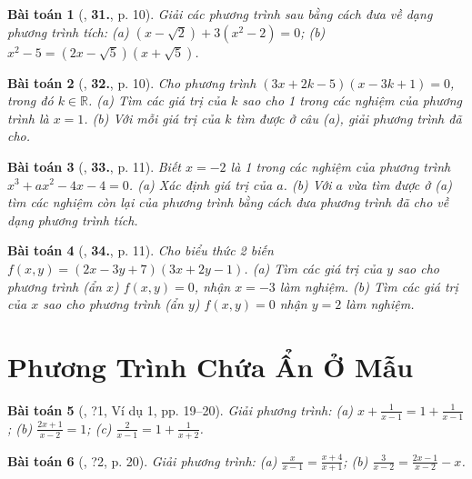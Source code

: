 \documentclass{article}
\numberwithin{equation}{section}
\newtheorem{baitoan}{Bài toán}
\begin{document}
\begin{baitoan}[\cite{SBT_Toan_8_tap_2}, \textbf{31.}, p. 10]
	Giải các phương trình sau bằng cách đưa về dạng phương trình tích: (a) $(x - \sqrt{2}) + 3(x^2 - 2) = 0$; (b) $x^2 - 5 = (2x - \sqrt{5})(x + \sqrt{5})$.
\end{baitoan}

\begin{baitoan}[\cite{SBT_Toan_8_tap_2}, \textbf{32.}, p. 10]
	Cho phương trình $(3x + 2k - 5)(x - 3k + 1) = 0$, trong đó $k\in\mathbb{R}$. (a) Tìm các giá trị của $k$ sao cho 1 trong các nghiệm của phương trình là $x = 1$. (b) Với mỗi giá trị của $k$ tìm được ở câu (a), giải phương trình đã cho.
\end{baitoan}

\begin{baitoan}[\cite{SBT_Toan_8_tap_2}, \textbf{33.}, p. 11]
	Biết $x = -2$ là 1 trong các nghiệm của phương trình $x^3 + ax^2 - 4x - 4 = 0$. (a) Xác định giá trị của $a$. (b) Với $a$ vừa tìm được ở (a) tìm các nghiệm còn lại của phương trình bằng cách đưa phương trình đã cho về dạng phương trình tích.
\end{baitoan}

\begin{baitoan}[\cite{SBT_Toan_8_tap_2}, \textbf{34.}, p. 11]
	Cho biểu thức 2 biến $f(x,y) = (2x - 3y + 7)(3x + 2y - 1)$. (a) Tìm các giá trị của $y$ sao cho phương trình (ẩn $x$) $f(x,y) = 0$, nhận $x = -3$ làm nghiệm. (b) Tìm các giá trị của $x$ sao cho phương trình (ẩn $y$) $f(x,y) = 0$ nhận $y = 2$ làm nghiệm.
\end{baitoan}


\section{Phương Trình Chứa Ẩn Ở Mẫu}

\begin{baitoan}[\cite{SGK_Toan_8_tap_2}, ?1, Ví dụ 1, pp. 19--20]
	Giải phương trình: (a) $x + \frac{1}{x - 1} = 1 + \frac{1}{x - 1}$; (b) $\frac{2x + 1}{x - 2} = 1$; (c) $\frac{2}{x - 1} = 1 + \frac{1}{x + 2}$.
\end{baitoan}

\begin{baitoan}[\cite{SGK_Toan_8_tap_2}, ?2, p. 20]
	Giải phương trình: (a) $\frac{x}{x - 1} = \frac{x + 4}{x + 1}$; (b) $\frac{3}{x - 2} = \frac{2x - 1}{x - 2} - x$.
\end{baitoan}
\end{document}
